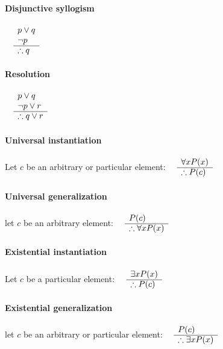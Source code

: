 \documentclass[a4paper]{article}
\begin{document}
\paragraph{Disjunctive syllogism}
  $\begin{array}{rl}
    & p \lor q \\
    & \lnot p \\
    \cline{2-2}
    &\therefore q
  \end{array}$
\paragraph{Resolution}
  $\begin{array}{rl}
    & p \lor q \\
    & \lnot p \lor r \\
    \cline{2-2}
    &\therefore q \lor r
  \end{array}$

  \paragraph{Universal instantiation}
  Let $c$ be an arbitrary or particular element:
  $\begin{array}{rl}
    & \forall x P(x) \\
    \cline {2-2}
    &\therefore P(c)
  \end{array}$
  \paragraph{Universal generalization}
  let $c$ be an arbitrary element: 
  $\begin{array}{rl}
    & P(c) \\
    \cline {2-2}
    &\therefore \forall x P(x)
  \end{array}$
  \paragraph{Existential instantiation}
  Let $c$ be a particular element: 
  $\begin{array}{rl}
    & \exists x P(x) \\
    \cline {2-2}
    &\therefore P(c)
  \end{array}$
  \paragraph{Existential generalization}
  let $c$ be an arbitrary or particular element: 
  $\begin{array}{rl}
    & P(c) \\
    \cline {2-2}
    &\therefore \exists x P(x)
  \end{array}$
  \pagebreak
\end{document}
